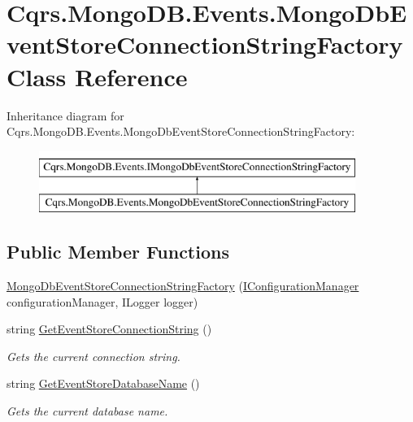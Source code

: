 \hypertarget{classCqrs_1_1MongoDB_1_1Events_1_1MongoDbEventStoreConnectionStringFactory}{}\section{Cqrs.\+Mongo\+D\+B.\+Events.\+Mongo\+Db\+Event\+Store\+Connection\+String\+Factory Class Reference}
\label{classCqrs_1_1MongoDB_1_1Events_1_1MongoDbEventStoreConnectionStringFactory}
Inheritance diagram for Cqrs.\+Mongo\+D\+B.\+Events.\+Mongo\+Db\+Event\+Store\+Connection\+String\+Factory\+:\begin{figure}[H]
\begin{center}
\leavevmode
\includegraphics[height=2.000000cm]{classCqrs_1_1MongoDB_1_1Events_1_1MongoDbEventStoreConnectionStringFactory}
\end{center}
\end{figure}
\subsection*{Public Member Functions}
\begin{DoxyCompactItemize}
\item 
\hyperlink{classCqrs_1_1MongoDB_1_1Events_1_1MongoDbEventStoreConnectionStringFactory_afb24fa31922f1297f7d7d80c7b14ee14_afb24fa31922f1297f7d7d80c7b14ee14}{Mongo\+Db\+Event\+Store\+Connection\+String\+Factory} (\hyperlink{interfaceCqrs_1_1Configuration_1_1IConfigurationManager}{I\+Configuration\+Manager} configuration\+Manager, I\+Logger logger)
\item 
string \hyperlink{classCqrs_1_1MongoDB_1_1Events_1_1MongoDbEventStoreConnectionStringFactory_af78f60c035678185ecd266019f42838b_af78f60c035678185ecd266019f42838b}{Get\+Event\+Store\+Connection\+String} ()
\begin{DoxyCompactList}\small\item\em Gets the current connection string. \end{DoxyCompactList}\item 
string \hyperlink{classCqrs_1_1MongoDB_1_1Events_1_1MongoDbEventStoreConnectionStringFactory_a282bda17095c8ea293f5305ea0d1b83c_a282bda17095c8ea293f5305ea0d1b83c}{Get\+Event\+Store\+Database\+Name} ()
\begin{DoxyCompactList}\small\item\em Gets the current database name. \end{DoxyCompactList}\end{DoxyCompactItemize}
